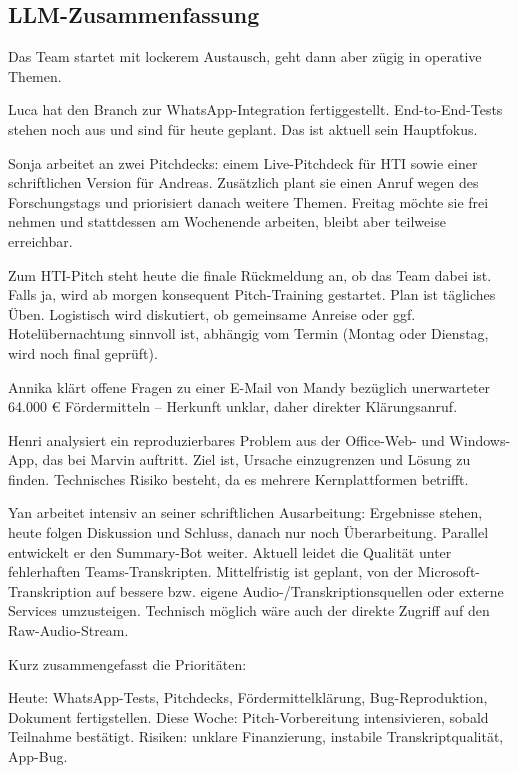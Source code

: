 \subsection{LLM-Zusammenfassung}
\label{app:Daily2_llm}
Das Team startet mit lockerem Austausch, geht dann aber zügig in operative Themen.

Luca hat den Branch zur WhatsApp-Integration fertiggestellt. End-to-End-Tests stehen noch aus und sind für heute geplant. Das ist aktuell sein Hauptfokus.

Sonja arbeitet an zwei Pitchdecks: einem Live-Pitchdeck für HTI sowie einer schriftlichen Version für Andreas. Zusätzlich plant sie einen Anruf wegen des Forschungstags und priorisiert danach weitere Themen. Freitag möchte sie frei nehmen und stattdessen am Wochenende arbeiten, bleibt aber teilweise erreichbar.

Zum HTI-Pitch steht heute die finale Rückmeldung an, ob das Team dabei ist. Falls ja, wird ab morgen konsequent Pitch-Training gestartet. Plan ist tägliches Üben. Logistisch wird diskutiert, ob gemeinsame Anreise oder ggf. Hotelübernachtung sinnvoll ist, abhängig vom Termin (Montag oder Dienstag, wird noch final geprüft).

Annika klärt offene Fragen zu einer E-Mail von Mandy bezüglich unerwarteter 64.000 € Fördermitteln – Herkunft unklar, daher direkter Klärungsanruf.

Henri analysiert ein reproduzierbares Problem aus der Office-Web- und Windows-App, das bei Marvin auftritt. Ziel ist, Ursache einzugrenzen und Lösung zu finden. Technisches Risiko besteht, da es mehrere Kernplattformen betrifft.

Yan arbeitet intensiv an seiner schriftlichen Ausarbeitung: Ergebnisse stehen, heute folgen Diskussion und Schluss, danach nur noch Überarbeitung. Parallel entwickelt er den Summary-Bot weiter. Aktuell leidet die Qualität unter fehlerhaften Teams-Transkripten. Mittelfristig ist geplant, von der Microsoft-Transkription auf bessere bzw. eigene Audio-/Transkriptionsquellen oder externe Services umzusteigen. Technisch möglich wäre auch der direkte Zugriff auf den Raw-Audio-Stream.

Kurz zusammengefasst die Prioritäten:

Heute: WhatsApp-Tests, Pitchdecks, Fördermittelklärung, Bug-Reproduktion, Dokument fertigstellen.
Diese Woche: Pitch-Vorbereitung intensivieren, sobald Teilnahme bestätigt.
Risiken: unklare Finanzierung, instabile Transkriptqualität, App-Bug.